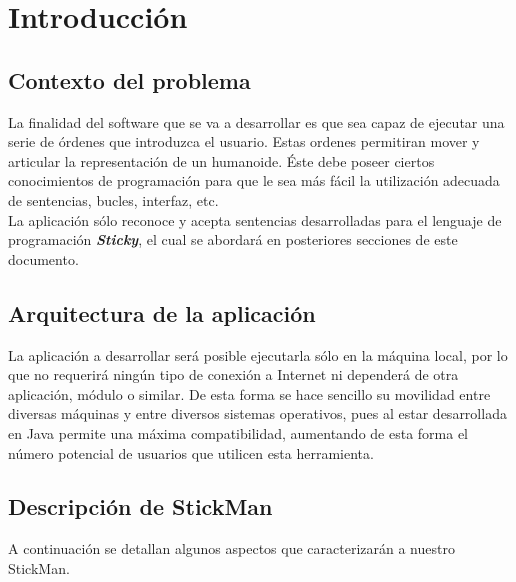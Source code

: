 \chapter{Introducción}

   \section{Contexto del problema}
   La finalidad del software que se va a desarrollar es que sea capaz de ejecutar una serie de órdenes que introduzca el usuario. Estas ordenes
   permitiran mover y articular la representación de un humanoide. Éste debe poseer ciertos conocimientos de programación para que le sea más 
   fácil la utilización adecuada de sentencias, bucles, interfaz, etc.\\

   La aplicación sólo reconoce y acepta sentencias desarrolladas para el lenguaje de programación \textbf{\textit{Sticky}}, el cual se abordará
   en posteriores secciones de este documento.\\


   \section{Arquitectura de la aplicación}
   La aplicación a desarrollar será posible ejecutarla sólo en la máquina local, por lo que no requerirá ningún tipo de conexión a Internet ni
   dependerá de otra aplicación, módulo o similar. De esta forma se hace sencillo su movilidad entre diversas máquinas y entre diversos sistemas
   operativos, pues al estar desarrollada en Java permite una máxima compatibilidad, aumentando de esta forma el número potencial de usuarios que
   utilicen esta herramienta.\\


   \section{Descripción de StickMan}
   A continuación se detallan algunos aspectos que caracterizarán a nuestro StickMan.\\

